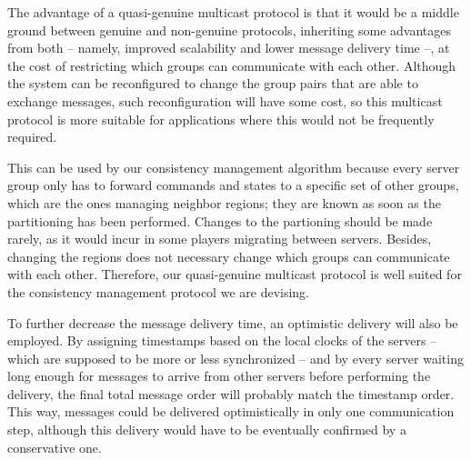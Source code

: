 \documentclass[]{usiinfprospectus}
\begin{document}
The advantage of a quasi-genuine multicast protocol is that it would be a middle ground between genuine and non-genuine protocols, inheriting some advantages from both -- namely, improved scalability and lower message delivery time --, at the cost of restricting which groups can communicate with each other. Although the system can be reconfigured to change the group pairs that are able to exchange messages, such reconfiguration will have some cost, so this multicast protocol is more suitable for applications where this would not be frequently required.

This can be used by our consistency management algorithm because every server group only has to forward commands and states to a specific set of other groups, which are the ones managing neighbor regions; they are known as soon as the partitioning has been performed. Changes to the partioning should be made rarely, as it would incur in some players migrating between servers. Besides, changing the regions does not necessary change which groups can communicate with each other. Therefore, our quasi-genuine multicast protocol is well suited for the consistency management protocol we are devising.

To further decrease the message delivery time, an optimistic delivery will also be employed. By assigning timestamps based on the local clocks of the servers -- which are supposed to be more or less synchronized -- and by every server waiting long enough for messages to arrive from other servers before performing the delivery, the final total message order will probably match the timestamp order. This way, messages could be delivered optimistically in only one communication step, although this delivery would have to be eventually confirmed by a conservative one.
\end{document}
